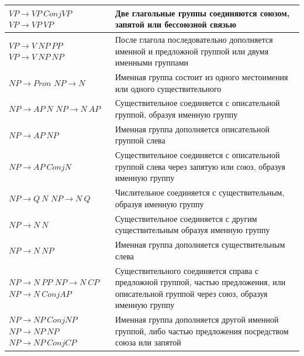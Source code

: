 \begin{longtable}{|L{.35\textwidth}|L{.55\textwidth}|}
	$VP \rightarrow VP\ ConjVP$\newline
	$VP \rightarrow VP\ VP$ &
	Две глагольные группы соединяются союзом, запятой или бессоюзной связью\\\hline
	
	$VP \rightarrow V\ NP\ PP$\newline
	$VP \rightarrow V\ NP\ NP$ &
	После глагола последовательно дополняется именной и предложной группой или двумя именными группами\\\hline
	
	$NP \rightarrow Pron$\newline
	$NP \rightarrow N$ &
	Именная группа состоит из одного местоимения или одного существительного\\\hline
	
	$NP \rightarrow AP\ N$\newline
	$NP \rightarrow N\ AP$ &
	Существительное соединяется с описательной группой, образуя именную группу\\\hline
	
	$NP \rightarrow AP\ NP$ & Именная группа дополняется описательной группой слева \\\hline
	$NP \rightarrow AP\ ConjN$ &
	Существительное соединяется с описательной группой слева через запятую или союз, образуя именную группу\\\hline
	
	$NP \rightarrow Q\ N$\newline
	$NP \rightarrow N\ Q$ &
	Числительное соединяется с существительным, образуя именную группу\\\hline
	
	$NP \rightarrow N\ N$ & Существительное соединяется с другим существительным образуя именную группу\\\hline
	$NP \rightarrow N\ NP$ & Именная группа дополняется существительным слева\\\hline
	
	$NP \rightarrow N\ PP$\newline
	$NP \rightarrow N\ CP$\newline
	$NP \rightarrow N\ ConjAP$ &
	Существительного соединяется справа с предложной группой, частью предложения, или описательной группой через союз, образуя именную группу\\\hline
	
	$NP \rightarrow NP\ ConjNP$\newline
	$NP \rightarrow NP\ NP$\newline
	$NP \rightarrow NP\ ConjCP$ &
	Именная группа дополняется другой именной группой, либо частью предложения посредством союза или запятой\\\hline
	

\end{longtable}
